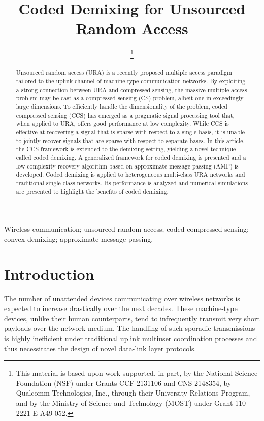 \documentclass[journal]{IEEEtran}
\title{Coded Demixing for Unsourced Random Access}
\author{\IEEEauthorblockN{
Jamison R. Ebert, \emph{Student Member, IEEE},
Vamsi K. Amalladinne, \emph{Member, IEEE}, \\
Stefano Rini, \emph{Member, IEEE},
Jean-Francois Chamberland, \emph{Senior Member, IEEE}, \\
Krishna R. Narayanan, \emph{Fellow, IEEE} \\}
\thanks{
This material is based upon work supported, in part, by the National Science Foundation (NSF) under Grants CCF-2131106 and CNS-2148354, by Qualcomm Technologies, Inc., through their University Relations Program, and by the Ministry of Science and Technology (MOST) under Grant 110-2221-E-A49-052.



}}
\begin{document}
\maketitle

\begin{abstract}
Unsourced random access (URA) is a recently proposed multiple access paradigm tailored to the uplink channel of machine-type communication networks.
By exploiting a strong connection between URA and compressed sensing, the massive multiple access problem may be cast as a compressed sensing (CS) problem, albeit one in exceedingly large dimensions.
To efficiently handle the dimensionality of the problem, coded compressed sensing (CCS) has emerged as a pragmatic signal processing tool that, when applied to URA, offers good performance at low complexity.
While CCS is effective at recovering a signal that is sparse with respect to a single basis, it is unable to jointly recover signals that are sparse with respect to separate bases. 
In this article, the CCS framework is extended to the demixing setting, yielding a novel technique called coded demixing.
A generalized framework for coded demixing is presented and a low-complexity recovery algorithm based on approximate message passing (AMP) is developed.
Coded demixing is applied to heterogeneous multi-class URA networks and traditional single-class networks.
Its performance is analyzed and numerical simulations are presented to highlight the benefits of coded demixing. 

\end{abstract}

\begin{IEEEkeywords}
Wireless communication; unsourced random access; coded compressed sensing; convex demixing; approximate message passing.
\end{IEEEkeywords}

\section{Introduction}
\label{section:Introduction}

The number of unattended devices communicating over wireless networks is expected to increase drastically over the next decades.
These machine-type devices, unlike their human counterparts, tend to infrequently transmit very short payloads over the network medium.
The handling of such sporadic transmissions is highly inefficient under traditional uplink multiuser coordination processes and thus necessitates the design of novel data-link layer protocols. 
\end{document}
